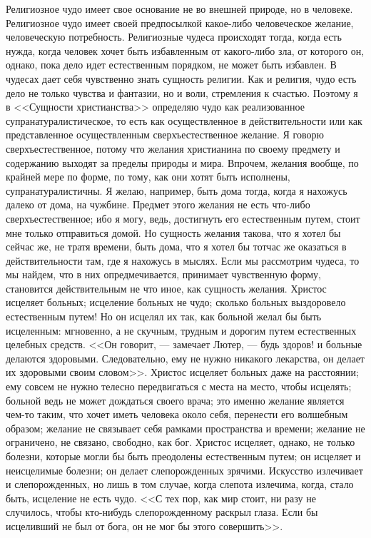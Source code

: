 \documentclass[12pt]{article}
\begin{document}
Религиозное чудо имеет свое основание не во внешней природе, но в человеке. Религиозное чудо имеет своей предпосылкой какое-либо человеческое желание, человеческую потребность. Религиозные чудеса происходят тогда, когда есть нужда, когда человек хочет быть избавленным от какого-либо зла, от которого он, однако, пока дело идет естественным порядком, не может быть избавлен. В чудесах дает себя чувственно знать сущность религии. Как и религия, чудо есть дело не только чувства и фантазии, но и воли, стремления к счастью. Поэтому я в <<Сущности христианства>> определяю чудо как реализованное супранатуралистическое, то есть как осуществленное в действительности или как представленное осуществленным сверхъестественное желание. Я говорю сверхъестественное, потому что желания христианина по своему предмету и содержанию выходят за пределы природы и мира. Впрочем, желания вообще, по крайней мере по форме, по тому, как они хотят быть исполнены, супранатуралистичны. Я желаю, например, быть дома тогда, когда я нахожусь далеко от дома, на чужбине. Предмет этого желания не есть что-либо сверхъестественное; ибо я могу, ведь, достигнуть его естественным путем, стоит мне только отправиться домой. Но сущность желания такова, что я хотел бы сейчас же, не тратя времени, быть дома, что я хотел бы тотчас же оказаться в действительности там, где я нахожусь в мыслях. Если мы рассмотрим чудеса, то мы найдем, что в них опредмечивается, принимает чувственную форму, становится действительным не что иное, как сущность желания. Христос исцеляет больных; исцеление больных не чудо; сколько больных выздоровело естественным путем! Но он исцелял их так, как больной желал бы быть исцеленным: мгновенно, а не скучным, трудным и дорогим путем естественных целебных средств. <<Он говорит, --- замечает Лютер, --- будь здоров! и больные делаются здоровыми. Следовательно, ему не нужно никакого лекарства, он делает их здоровыми своим словом>>. Христос исцеляет больных даже на расстоянии; ему совсем не нужно телесно передвигаться с места на место, чтобы исцелять; больной ведь не может дождаться своего врача; это именно желание является чем-то таким, что хочет иметь человека около себя, перенести его волшебным образом; желание не связывает себя рамками пространства и времени; желание не ограничено, не связано, свободно, как бог. Христос исцеляет, однако, не только болезни, которые могли бы быть преодолены естественным путем; он исцеляет и неисцелимые болезни; он делает слепорожденных зрячими. Искусство излечивает и слепорожденных, но лишь в том случае, когда слепота излечима, когда, стало быть, исцеление не есть чудо. <<С тех пор, как мир стоит, ни разу не случилось, чтобы кто-нибудь слепорожденному раскрыл глаза. Если бы исцеливший не был от бога, он не мог бы этого совершить>>. 
\end{document}
